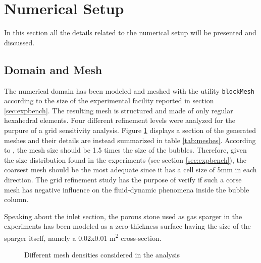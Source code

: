 \documentclass[11pt,a4paper]{article}
\begin{document}
\section{Numerical Setup}
\label{sec:numsetup}
In this section all the details related to the numerical setup will be presented and discussed.




\subsection{Domain and Mesh}
\label{sub:domain}
The numerical domain has been modeled and meshed with the utility \texttt{blockMesh} according to the size of the experimental facility reported in section \ref{sec:expbench}. The resulting mesh is structured and made of only regular hexahedral elements. Four different refinement levels were analyzed for the purpure of a grid sensitivity analysis. Figure \ref{fig:mesh} displays a section of the generated meshes and their details are instead summarized in table \ref{tab:meshes}. According to \cite{krepper}, the mesh size should be 1.5 times the size of the bubbles. Therefore, given the size distribution found in the experiments (see section \ref{sec:expbench}),  the coarsest mesh should be the most adequate since it has a cell size of 5mm in each direction. The grid refinement study has the purpose of verify if such a corse mesh has  negative influence on the fluid-dynamic phenomena inside the bubble column.
 
Speaking about the inlet section, the porous stone used as gas sparger in the experiments has been modeled as a zero-thickness surface having the size of the sparger itself, namely a 0.02x0.01 m\textsuperscript{2} cross-section.


\begin{figure}[H]
    \centering
    \caption[]{Different mesh densities considered in the analysis}
    \label{fig:mesh} 
\end{figure}
\end{document}
